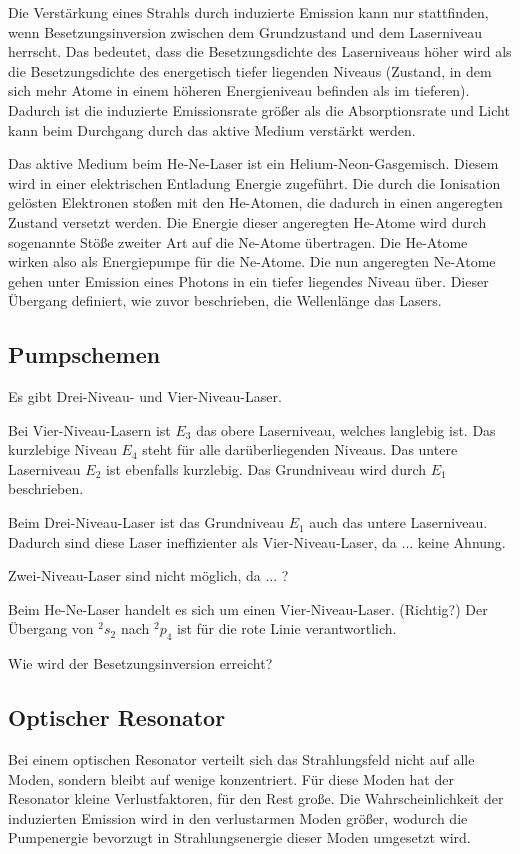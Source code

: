 Die Verstärkung eines Strahls durch induzierte Emission kann nur stattfinden, wenn Besetzungsinversion zwischen dem Grundzustand und dem Laserniveau herrscht. Das bedeutet, dass die Besetzungsdichte des Laserniveaus höher wird als die Besetzungsdichte des energetisch tiefer liegenden Niveaus (Zustand, in dem sich mehr Atome in einem höheren Energieniveau befinden als im tieferen). Dadurch ist die induzierte Emissionsrate größer als die Absorptionsrate und Licht kann beim Durchgang durch das aktive Medium verstärkt werden.

Das aktive Medium beim He-Ne-Laser ist ein Helium-Neon-Gasgemisch. Diesem wird in einer elektrischen Entladung Energie zugeführt. Die durch die Ionisation gelösten Elektronen stoßen mit den He-Atomen, die dadurch in einen angeregten Zustand versetzt werden. Die Energie dieser angeregten He-Atome wird durch sogenannte Stöße zweiter Art auf die Ne-Atome übertragen. Die He-Atome wirken also als Energiepumpe für die Ne-Atome. Die nun angeregten Ne-Atome gehen unter Emission eines Photons in ein tiefer liegendes Niveau über. Dieser Übergang definiert, wie zuvor beschrieben, die Wellenlänge das Lasers.

\subsection{Pumpschemen}
Es gibt Drei-Niveau- und Vier-Niveau-Laser.

Bei Vier-Niveau-Lasern ist $E_3$ das obere Laserniveau, welches langlebig ist. Das kurzlebige Niveau $E_4$ steht für alle darüberliegenden Niveaus. Das untere Laserniveau $E_2$ ist ebenfalls kurzlebig. Das Grundniveau wird durch $E_1$ beschrieben.

Beim Drei-Niveau-Laser ist das Grundniveau $E_1$ auch das untere Laserniveau. Dadurch sind diese Laser ineffizienter als Vier-Niveau-Laser, da ... keine Ahnung.

Zwei-Niveau-Laser sind nicht möglich, da ... ?

Beim He-Ne-Laser handelt es sich um einen Vier-Niveau-Laser. (Richtig?)
Der Übergang von $^2s_2$ nach $^2p_4$ ist für die rote Linie verantwortlich.

Wie wird der Besetzungsinversion erreicht?

\subsection{Optischer Resonator}
Bei einem optischen Resonator verteilt sich das Strahlungsfeld nicht auf alle Moden, sondern bleibt auf wenige konzentriert. Für diese Moden hat der Resonator kleine Verlustfaktoren, für den Rest große. Die Wahrscheinlichkeit der induzierten Emission wird in den verlustarmen Moden größer, wodurch die Pumpenergie bevorzugt in Strahlungsenergie dieser Moden umgesetzt wird.

